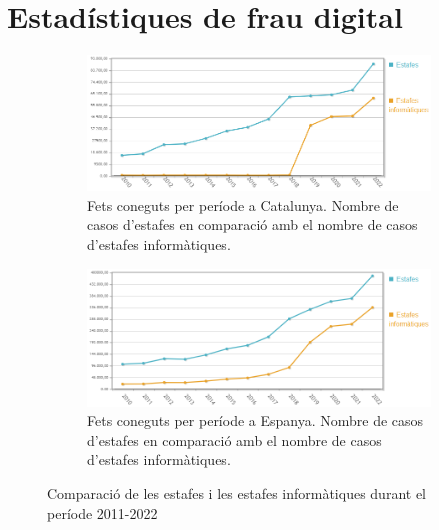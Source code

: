 \chapter{Estadístiques de frau digital}
\label{sec:stats_frau_digital}

\begin{figure}[H]
    \centering
    \begin{subfigure}[b]{0.8\textwidth}
      \includegraphics[width=\linewidth]{estafes_CAT.png}
      \caption{Fets coneguts per període a Catalunya. Nombre de casos d'estafes en comparació amb el nombre de casos d'estafes informàtiques.}
      \label{fig:estafes_cat}
    \end{subfigure}
  
    \vspace{1em} %
  
    \begin{subfigure}[b]{0.8\textwidth}
      \includegraphics[width=\linewidth]{estafes_TOTAL.png}
      \caption{Fets coneguts per període a Espanya. Nombre de casos d'estafes en comparació amb el nombre de casos d'estafes informàtiques.}
      \label{fig:victims}
    \end{subfigure}
    
    \caption{Comparació de les estafes i les estafes informàtiques durant el període 2011-2022}
    \label{fig:estafes_2}
\end{figure}




